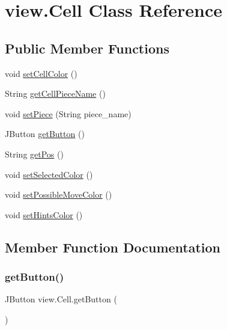 \hypertarget{classview_1_1_cell}{}\section{view.\+Cell Class Reference}
\label{classview_1_1_cell}
\subsection*{Public Member Functions}
\begin{DoxyCompactItemize}
\item 
void \mbox{\hyperlink{classview_1_1_cell_add1bd5d5569cc0c48cb317629ec3fa37}{set\+Cell\+Color}} ()
\item 
String \mbox{\hyperlink{classview_1_1_cell_aa4164745bbe6060548db4a791d8e02a1}{get\+Cell\+Piece\+Name}} ()
\item 
void \mbox{\hyperlink{classview_1_1_cell_af2cf8437eb1b84d7dffcc31aceaadf49}{set\+Piece}} (String piece\+\_\+name)
\item 
J\+Button \mbox{\hyperlink{classview_1_1_cell_a9e1fb5c80457544de18d2d86246fff46}{get\+Button}} ()
\item 
String \mbox{\hyperlink{classview_1_1_cell_ac29606b6983a42d33b53cc50d999a7d8}{get\+Pos}} ()
\item 
void \mbox{\hyperlink{classview_1_1_cell_a3c85b10fac6cfb0583903f13376c9ec4}{set\+Selected\+Color}} ()
\item 
void \mbox{\hyperlink{classview_1_1_cell_a137e09b0f767a45cc7dfb00b538adf33}{set\+Possible\+Move\+Color}} ()
\item 
void \mbox{\hyperlink{classview_1_1_cell_a4e042931877eaab67434d38117c21a56}{set\+Hints\+Color}} ()
\end{DoxyCompactItemize}


\subsection{Member Function Documentation}
\mbox{\label{classview_1_1_cell_a9e1fb5c80457544de18d2d86246fff46}} 
\subsubsection{\texorpdfstring{getButton()}{getButton()}}
{\footnotesize\ttfamily J\+Button view.\+Cell.\+get\+Button (\begin{DoxyParamCaption}{ }\end{DoxyParamCaption})\hspace{0.3cm}{\ttfamily [inline]}}

